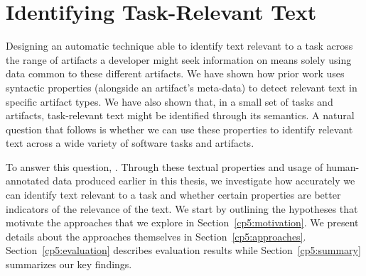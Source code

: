 \setcounter{chapter}{4}
\setcounter{rq}{1}


\chapter{Identifying Task-Relevant Text}
\label{ch:identifying}



Designing an automatic technique able to identify text relevant to a task across the range of artifacts a developer might seek information on means solely using data common to these different artifacts.
We have shown how  prior work uses syntactic properties (alongside an artifact's meta-data)
to detect relevant text in specific artifact types.
We have also shown that, in a small set of tasks and artifacts, task-relevant text might be identified through its semantics.
A natural question that follows is whether we can use these properties to identify relevant text across a wide variety of software tasks and artifacts.




To answer this question, .
Through these textual properties and usage of human-annotated data produced earlier in this thesis, we 
investigate how accurately we can identify text relevant to a task and whether certain properties are better indicators of the relevance of the text.
We start by outlining the hypotheses that motivate the approaches that we explore in Section~\ref{cp5:motivation}.
We present details about the approaches themselves in Section~\ref{cp5:approaches}.
Section~\ref{cp5:evaluation} describes evaluation results while
Section~\ref{cp5:summary} summarizes our key findings.





% 
% 
% 


